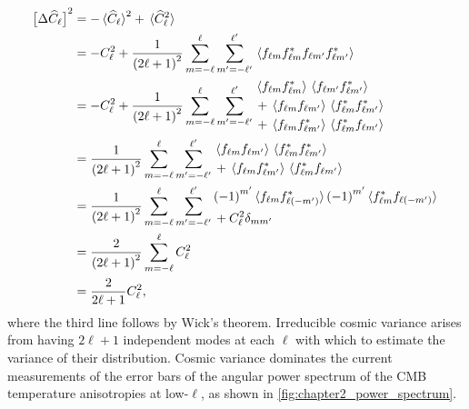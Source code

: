 \begin{align}
	\variance{\powerSpectrumHat}
	 & = - \expval*{\powerSpectrumHat}^{2} + \expval*{\powerSpectrumHat^{2}} \nonumber{}                                                                                                                     \\
	 & = - \powerSpectrum^{2} + \frac{1}{{(2\ell+1)}^{2}} \sum\limits_{m=-\ell}^{\ell} \sum\limits_{m'=-\ell'}^{\ell'} \expval*{\harmonic{f} \conj{\harmonic{f}} f_{\ell m'} \conj{f_{\ell m'}}} \nonumber{} \\
	 & = - \powerSpectrum^{2} + \frac{1}{{(2\ell+1)}^{2}} \sum\limits_{m=-\ell}^{\ell} \sum\limits_{m'=-\ell'}^{\ell'}
	\begin{aligned}
		 & \expval*{\harmonic{f} \conj{\harmonic{f}}}  \expval*{f_{\ell m'} \conj{f_{\ell m'}}} \nonumber{}  \\
		 & + \expval*{\harmonic{f} f_{\ell m'}} \expval*{\conj{\harmonic{f}} \conj{f_{\ell m'}}} \nonumber{} \\
		 & + \expval*{\harmonic{f} \conj{f_{\ell m'}}} \expval*{\conj{\harmonic{f}} f_{\ell m'}}
	\end{aligned} \nonumber{}                                                              \\
	 & = \frac{1}{{(2\ell+1)}^{2}} \sum\limits_{m=-\ell}^{\ell} \sum\limits_{m'=-\ell'}^{\ell'}
	\begin{aligned}
		 & \expval*{\harmonic{f} f_{\ell m'}} \expval*{\conj{\harmonic{f}} \conj{f_{\ell m'}}} \nonumber{} \\
		 & + \expval*{\harmonic{f} \conj{f_{\ell m'}}} \expval*{\conj{\harmonic{f}} f_{\ell m'}}
	\end{aligned} \nonumber{}                                                                \\
	 & = \frac{1}{{(2\ell+1)}^{2}} \sum\limits_{m=-\ell}^{\ell} \sum\limits_{m'=-\ell'}^{\ell'}
	\begin{aligned}
		 & \phaseFactor['] \expval*{\harmonic{f} \conj{f_{\ell(-m')}}} \phaseFactor['] \expval*{\conj{\harmonic{f}} f_{\ell(-m')}} \nonumber{} \\
		 & + \powerSpectrum^{2} \delta_{m m'}
	\end{aligned} \nonumber{}                                \\
	 & = \frac{2}{{(2\ell+1)}^{2}} \sum\limits_{m=-\ell}^{\ell} \powerSpectrum^{2} \nonumber{}                                                                                                               \\
	 & = \frac{2}{2\ell+1} \powerSpectrum^{2},
\end{align}
%
where the third line follows by Wick's theorem.
Irreducible cosmic variance arises from having \(2\ell+1\) independent modes at each \(\ell{}\) with which to estimate the variance of their distribution.
Cosmic variance dominates the current measurements of the error bars of the angular power spectrum of the CMB temperature anisotropies at low-\(\ell{}\), as shown in \cref{fig:chapter2_power_spectrum}.

